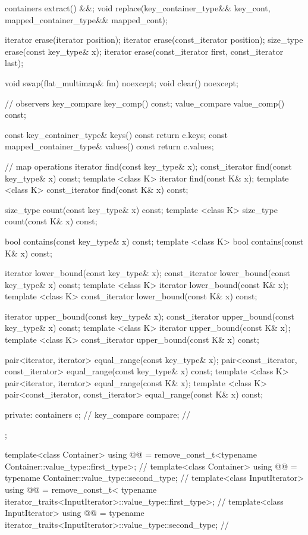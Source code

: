\begin{codeblock}
\begin{codeblock}
\begin{codeblock}
\begin{addedblock}
\begin{codeblock}
{{    containers extract() &&;
    void replace(key_container_type&& key_cont, mapped_container_type&& mapped_cont);

    iterator erase(iterator position);
    iterator erase(const_iterator position);
    size_type erase(const key_type& x);
    iterator erase(const_iterator first, const_iterator last);

    void swap(flat_multimap& fm) noexcept;
    void clear() noexcept;

    // observers
    key_compare key_comp() const;
    value_compare value_comp() const;

    const key_container_type& keys() const      { return c.keys; }
    const mapped_container_type& values() const { return c.values; }

    // map operations
    iterator find(const key_type& x);
    const_iterator find(const key_type& x) const;
    template <class K> iterator find(const K& x);
    template <class K> const_iterator find(const K& x) const;

    size_type count(const key_type& x) const;
    template <class K> size_type count(const K& x) const;

    bool contains(const key_type& x) const;
    template <class K> bool contains(const K& x) const;

    iterator lower_bound(const key_type& x);
    const_iterator lower_bound(const key_type& x) const;
    template <class K> iterator lower_bound(const K& x);
    template <class K> const_iterator lower_bound(const K& x) const;

    iterator upper_bound(const key_type& x);
    const_iterator upper_bound(const key_type& x) const;
    template <class K> iterator upper_bound(const K& x);
    template <class K> const_iterator upper_bound(const K& x) const;

    pair<iterator, iterator> equal_range(const key_type& x);
    pair<const_iterator, const_iterator> equal_range(const key_type& x) const;
    template <class K>
      pair<iterator, iterator> equal_range(const K& x);
    template <class K>
      pair<const_iterator, const_iterator> equal_range(const K& x) const;

  private:
    containers c;        // \expos
    key_compare compare; // \expos
  };

  template<class Container>
    using @@ =
      remove_const_t<typename Container::value_type::first_type>;          // \expos
  template<class Container>
    using @@ =
      typename Container::value_type::second_type;                        // \expos
  template<class InputIterator>
    using @@ = remove_const_t<
      typename iterator_traits<InputIterator>::value_type::first_type>;   // \expos
  template<class InputIterator>
    using @@ =
      typename iterator_traits<InputIterator>::value_type::second_type;   // \expos

}
\end{codeblock}
\end{addedblock}
\end{codeblock}
\end{codeblock}
\end{codeblock}
